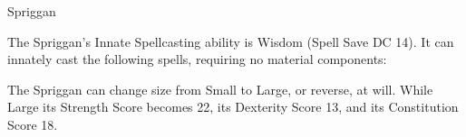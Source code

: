 \begin{DndMonster}[width=0.5\textwidth]{Spriggan\label{monster:Spriggan}}
	\DndMonsterAttack[
		name			= Stone Sword (Large Form only),
		distance		= melee,	%
		mod				= +9,
		reach			= 10,
		targets			= one target,
		dmg				= \DndDice{3d10 + 6},
		dmg-type		= Slashing,
		extra			= {. This attack can only be used if the Spriggan used Stone Shape to create a Stone Sword},
	]
	
	\begin{DndMonsterSpells}
		\item[Innate Spellcasting] The Spriggan's Innate Spellcasting ability is Wisdom (Spell Save DC 14). It can innately cast the following spells, requiring no material components:
	\end{DndMonsterSpells}
	
	The Spriggan can change size from Small to Large, or reverse, at will. While Large its Strength Score becomes 22, its Dexterity Score 13, and its Constitution Score 18.
\end{DndMonster}
